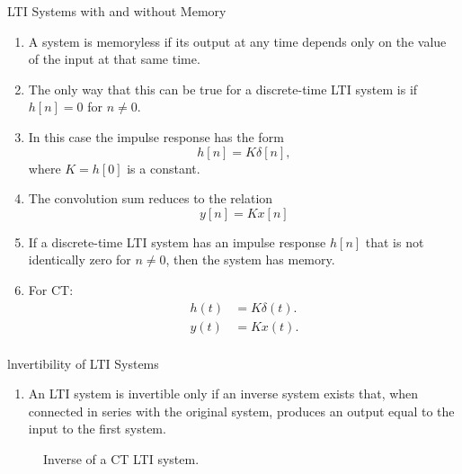 \begin{frame}{LTI Systems with and without Memory}
    \begin{enumerate}
        \item A system is memoryless if its output at any time depends only on the value of the input at that same time.
        \item The only way that this can be true for a discrete-time LTI system is if $h[n] = 0$ for $n \neq 0$.
        \item In this case the impulse response has the form
        \begin{equation*}
            h[n] = K\delta[n],
        \end{equation*}
        where $K = h[0]$ is a constant.
        \item The convolution sum reduces to the relation
        \begin{equation*}
            y[n] = Kx[n]
        \end{equation*}
        \item If a discrete-time LTI system has an impulse response $h[n]$ that is not identically zero for $n \neq 0$, then the system has memory.
        \item For CT:
            \begin{align*}
                h(t) &= K\delta(t).\\
                y(t) &= Kx(t).\\
            \end{align*}
    \end{enumerate}

\end{frame}





\begin{frame}{lnvertibility of LTI Systems}
    \begin{enumerate}
        \item An LTI system is invertible only if an inverse system exists that, when connected in series with the original system, produces an output equal to the input to the first system.
    \end{enumerate}

    {
    \begin{figure}
      \centering
      
      \caption{Inverse of a CT LTI system.}\label{fi:lti_inverse}
    \end{figure}
    }
\end{frame}



